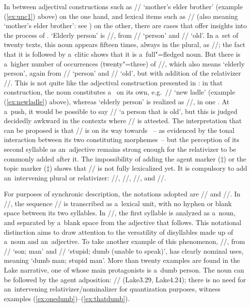 In between adjectival constructions such as // ‘mother’s elder brother’ (example (\ref{ex:unc1}) above) on the one hand, and lexical items such as // (also meaning ‘mother’s elder brother’: see ) on the other, there are cases that offer insights into the process of . ‘Elderly person’ is //, from // ‘person’ and // ‘old’. In a~set of twenty texts, this noun appears fifteen times, always in the plural, as //; the fact that it is followed by a~clitic shows that it is a~full"=fledged noun. But there is a~higher number of occurrences (twenty"=three) of //, which also means ‘elderly person’, again from \mbox{//} ‘person’ and // ‘old’, but with addition of the relativizer \mbox{//}. This is not quite like the adjectival construction presented in : in that construction, the noun constitutes a~ on its own, e.g.~// ‘new ladle’ (example (\ref{ex:newladle}) above), whereas ‘elderly person’ is realized as //, in one . At a~push, it would be possible to say // ‘a person that is old’, but this is judged decidedly awkward in the contexts where // is attested. The interpretation that can be proposed is that // is on its way towards ~-- as evidenced by the tonal interaction between its two constituting morphemes~-- but the perception of its second syllable as an~adjective remains strong enough for the relativizer to be commonly added after it. The impossibility of adding the agent marker ($\ddagger${\kern2pt}) or the topic marker ($\ddagger${\kern2pt})  shows that // is not fully lexicalized yet. It is compulsory to add an~intervening plural or relativizer: //, //, //, and //.

\newpage 
For purposes of synchronic description, the notations adopted are // and //. In //, the sequence // is transcribed as a~lexical unit, with no hyphen or blank space between its two syllables. In //, the first syllable is analyzed as a~noun, and separated by a~blank space from the adjective that follows. This notational distinction aims to draw attention to the versatility of disyllables made up of a~noun and an~adjective. To take another example of this phenomenon, //, from // ‘son; man’ and // ‘stupid; dumb (unable to speak)’, has clearly nominal uses, meaning ‘dumb man; stupid man’. More than twenty examples are found in the Lake narrative, one of whose main protagonists is a~dumb person. The noun can be followed by the agent adposition: // (Lake3.29, Lake4.24); there is no need for an~intervening {relativizer{\slash}nominalizer} for quantization purposes, witness examples (\ref{ex:onedumb})--(\ref{ex:thatdumb}).

